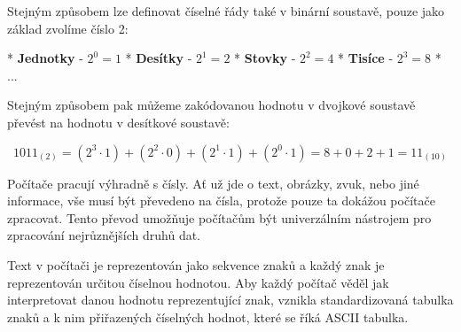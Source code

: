 Stejným způsobem lze definovat číselné řády také v binární soustavě, pouze jako základ zvolíme číslo 2:

\begitems 
* {\bf Jednotky} - $2^0 = 1$
* {\bf Desítky} - $2^1 = 2$
* {\bf Stovky} - $2^2 = 4$
* {\bf Tisíce} - $2^3 = 8$
* ...
\enditems

Stejným způsobem pak můžeme zakódovanou hodnotu v dvojkové soustavě převést na hodnotu v desítkové soustavě:

$$
1011_{(2)} = (2^3 \cdot 1) + (2^2 \cdot 0) + (2^1 \cdot 1) + (2^0 \cdot 1) = 8 + 0 + 2 + 1 = 11_{(10)}
$$

Počítače pracují výhradně s čísly. Ať už jde o text, obrázky, zvuk, nebo jiné informace, vše musí být převedeno na čísla, protože pouze ta dokážou počítače zpracovat. Tento převod umožňuje počítačům být univerzálním nástrojem pro zpracování nejrůznějších druhů dat.

Text v počítači je reprezentován jako sekvence znaků a každý znak je reprezentován určitou číselnou hodnotou. Aby každý počítač věděl jak interpretovat danou hodnotu reprezentující znak, vznikla standardizovaná tabulka znaků a k nim přiřazených číselných hodnot, které se říká ASCII tabulka.

